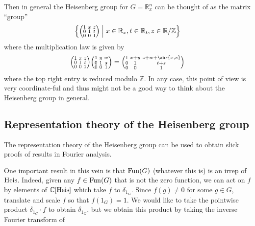 \documentclass[../../rtnotes.tex]{subfiles}
\begin{document}
Then in general the Heisenberg group for $G = \mathbb R_x^n$ can be thought of as the matrix ``group''
\[\Bigl\{\Bigl(\!\begin{smallmatrix}
    1 & x & z\\
    0 & 1 & t\\
    0 & 0 & 1
\end{smallmatrix}\!\Bigr)\Bigm\vert x\in\mathbb R_x,t\in\mathbb R_t, z\in\mathbb R/\mathbb Z\Bigr\}\] where the multiplication law is given by
\[\Bigl(\!\begin{smallmatrix}
    1 & x & z\\
    0 & 1 & t\\
    0 & 0 & 1
\end{smallmatrix}\!\Bigr)\Bigl(\!\begin{smallmatrix}
    1 & y & w\\
    0 & 1 & s\\
    0 & 0 & 1
\end{smallmatrix}\!\Bigr) = \Bigl(\!\begin{smallmatrix}
    1 & x+y & z+w+\abr{x,s}\\
    0 & 1 & t+s\\
    0 & 0 & 1
\end{smallmatrix}\!\Bigr)\]
where the top right entry is reduced modulo $\mathbb Z$. In any case, this point of view is very coordinate-ful and thus might not be a good way to think about the Heisenberg group in general.

\subsection{Representation theory of the Heisenberg group}
The representation theory of the Heisenberg group can be used to obtain slick proofs of results in Fourier analysis.

One important result in this vein is that $\operatorname{Fun}(G)$ (whatever this is) is an irrep of $\operatorname{Heis}$. Indeed, given any $f\in \operatorname{Fun}(G)$ that is not the zero function, we can act on $f$ by elements of $\mathbb C[\operatorname{Heis}]$ which take $f$ to $\delta_{1_G}$. Since $f(g) \neq 0$ for some $g\in G$, translate and scale $f$ so that $f(1_G) = 1$. We would like to take the pointwise product $\delta_{1_G}\cdot f$ to obtain $\delta_{1_G}$, but we obtain this product by taking the inverse Fourier transform of 
\end{document}
